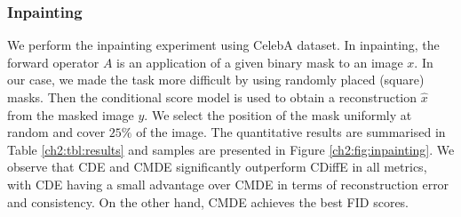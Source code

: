 \begin{table}[ht]
    \centering
    \caption{Results of conditional generation tasks.}
    \label{ch2:tbl:results}
  \end{table}

  \subsubsection{Inpainting}

  We perform the inpainting experiment using CelebA dataset. In inpainting, the forward operator $A$ is an application of a given binary mask to an image $x$.  In our case, we made the task more difficult by using randomly placed (square) masks. Then the conditional score model is used to obtain a reconstruction $\hat{x}$ from the masked image $y$. We select the position of the mask uniformly at random and cover $25\%$ of the image. The quantitative results are summarised in Table \ref{ch2:tbl:results} and samples are presented in Figure \ref{ch2:fig:inpainting}. We observe that CDE and CMDE significantly outperform CDiffE in all metrics, with CDE having a small advantage over CMDE in terms of reconstruction error and consistency. On the other hand, CMDE achieves the best FID scores.


